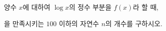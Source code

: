 양수 $x$에 대하여 $\log x$의 정수 부분을 $f(x)$라 할 때, \par\smallskip{}\par\smallskip\noindent 을 만족시키는 $100$ 이하의 자연수 $n$의 개수를 구하시오.
